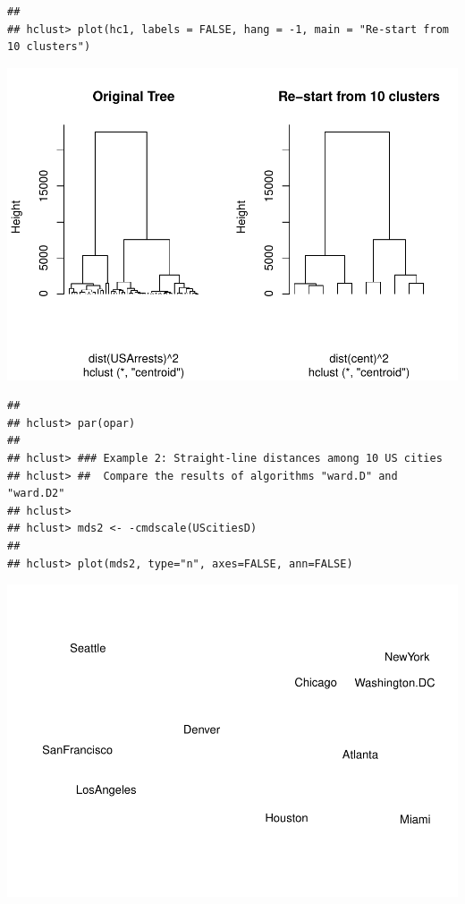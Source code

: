 \documentclass[
]{book}
\begin{document}
\begin{verbatim}
## 
## hclust> plot(hc1, labels = FALSE, hang = -1, main = "Re-start from 10 clusters")
\end{verbatim}

\includegraphics{bookdown-demo_files/figure-latex/unnamed-chunk-11-3.pdf}

\begin{verbatim}
## 
## hclust> par(opar)
## 
## hclust> ### Example 2: Straight-line distances among 10 US cities
## hclust> ##  Compare the results of algorithms "ward.D" and "ward.D2"
## hclust> 
## hclust> mds2 <- -cmdscale(UScitiesD)
## 
## hclust> plot(mds2, type="n", axes=FALSE, ann=FALSE)
\end{verbatim}

\includegraphics{bookdown-demo_files/figure-latex/unnamed-chunk-11-4.pdf}
\end{document}
